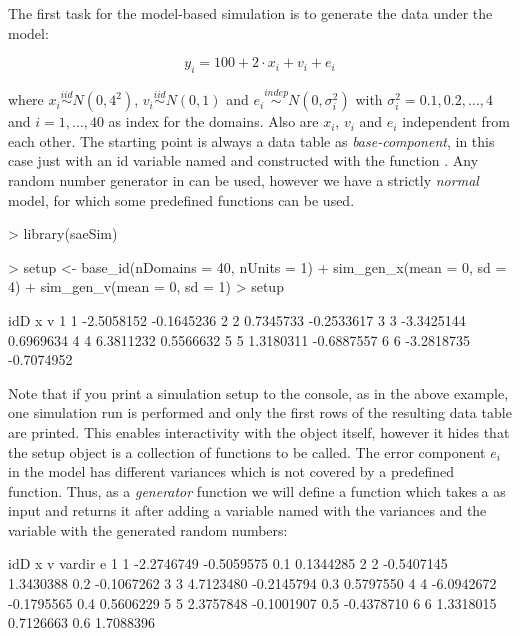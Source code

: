 \documentclass[article]{ajs}
\begin{document}
The first task for the model-based simulation is to generate the data under the model:

\[ y_i = 100 + 2 \cdot x_i + v_i + e_i\]

where $x_i \stackrel{iid}{\sim} N(0, 4^2)$, $v_i \stackrel{iid}{\sim} N(0, 1)$ and $e_i \stackrel{indep}{\sim} N(0, \sigma_i^2)$ with $\sigma_i^2 = 0.1, 0.2, \dots, 4$ and $i = 1, \dots, 40$ as index for the domains. Also are $x_i$, $v_i$ and $e_i$ independent from each other. The starting point is always a data table as \textit{base-component}, in this case just with an id variable named  and constructed with the function . Any random number generator in  can be used, however we have a strictly \textit{normal} model, for which some predefined functions can be used.

\begin{Schunk}
\begin{Sinput}
> library(saeSim)
\end{Sinput}
\end{Schunk}
\begin{Schunk}
\begin{Sinput}
> setup <- base_id(nDomains = 40, nUnits = 1) %
+   sim_gen_x(mean = 0, sd = 4) %
+   sim_gen_v(mean = 0, sd = 1)
> setup
\end{Sinput}
\begin{Soutput}
  idD          x          v
1   1 -2.5058152 -0.1645236
2   2  0.7345733 -0.2533617
3   3 -3.3425144  0.6969634
4   4  6.3811232  0.5566632
5   5  1.3180311 -0.6887557
6   6 -3.2818735 -0.7074952
\end{Soutput}
\end{Schunk}

Note that if you print a simulation setup to the console, as in the above example, one simulation run is performed and only the first rows of the resulting data table are printed. This enables interactivity with the object itself, however it hides that the setup object is a collection of functions to be called. The error component $e_i$ in the model has different variances which is not covered by a predefined function. Thus, as a \textit{generator} function we will define a function which takes a  as input and returns it after adding a variable named  with the variances and the variable  with the generated random numbers:

\begin{Schunk}
\begin{Soutput}
  idD          x          v vardir          e
1   1 -2.2746749 -0.5059575    0.1  0.1344285
2   2 -0.5407145  1.3430388    0.2 -0.1067262
3   3  4.7123480 -0.2145794    0.3  0.5797550
4   4 -6.0942672 -0.1795565    0.4  0.5606229
5   5  2.3757848 -0.1001907    0.5 -0.4378710
6   6  1.3318015  0.7126663    0.6  1.7088396
\end{Soutput}
\end{Schunk}
\end{document}
